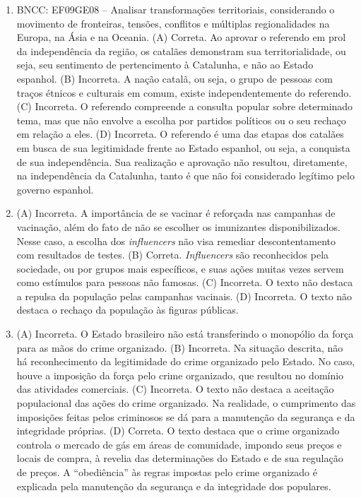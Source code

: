 
\begin{enumerate}
\item
BNCC: EF09GE08 -- Analisar transformações territoriais, considerando o
movimento de fronteiras, tensões, conflitos e múltiplas regionalidades
na Europa, na Ásia e na Oceania. (A) Correta. Ao aprovar o referendo em prol da independência da região, os catalães demonstram sua territorialidade, ou seja, seu sentimento de pertencimento à Catalunha, e não ao Estado espanhol. (B) Incorreta. A nação catalã, ou seja, o grupo de pessoas com traços étnicos e culturais em comum, existe independentemente do referendo. (C) Incorreta. O referendo compreende a consulta popular sobre determinado tema, mas que não envolve a escolha por partidos políticos ou o seu rechaço em relação a eles. (D) Incorreta. O referendo é uma das etapas dos catalães em busca de sua legitimidade frente ao Estado espanhol, ou seja, a conquista de sua independência. Sua realização e aprovação não resultou, diretamente, na independência da Catalunha, tanto é que não foi considerado legítimo pelo governo espanhol.

\item
(A) Incorreta. A importância de se vacinar é reforçada nas campanhas de
vacinação, além do fato de não se escolher os imunizantes
disponibilizados. Nesse caso, a escolha dos \emph{influencers} não visa
remediar descontentamento com resultados de testes.
(B) Correta. \emph{Influencers} são reconhecidos pela sociedade, ou por
grupos mais específicos, e suas ações muitas vezes servem como estímulos
para pessoas não famosas.
(C) Incorreta. O texto não destaca a repulsa da população pelas campanhas
vacinais.
(D) Incorreta. O texto não destaca o rechaço da população às figuras
públicas.

\item
(A) Incorreta. O Estado brasileiro não está transferindo o monopólio da
força para as mãos do crime organizado.
(B) Incorreta. Na situação descrita, não há reconhecimento da
legitimidade do crime organizado pelo Estado. No caso, houve a imposição
da força pelo crime organizado, que resultou no domínio das atividades
comerciais.
(C) Incorreta. O texto não destaca a aceitação populacional das ações do
crime organizado. Na realidade, o cumprimento das imposições feitas
pelos criminosos se dá para a manutenção da segurança e da integridade
próprias.
(D) Correta. O texto destaca que o crime organizado controla o mercado de
gás em áreas de comunidade, impondo seus preços e locais de compra, à
revelia das determinações do Estado e de sua regulação de preços. A
``obediência'' às regras impostas pelo crime organizado é explicada pela
manutenção da segurança e da integridade dos populares.
\end{enumerate}

